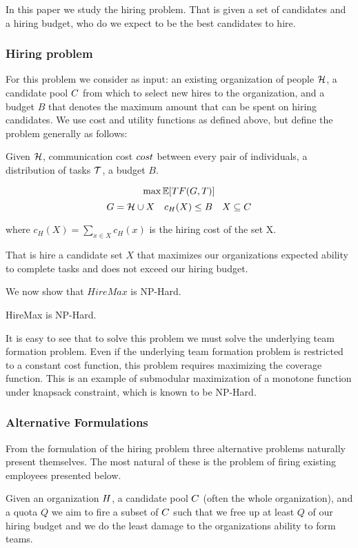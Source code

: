 In this paper we study the hiring problem. That is given a set of candidates and a hiring budget, who do we expect to be the best candidates to hire. 
\subsubsection{Hiring problem}

For this problem we consider as input: an existing organization of people $\mathcal{H}$, a candidate pool ${C}$ from which to select new hires to the organization, and a budget $B$ that denotes the maximum amount that can be spent on hiring candidates.
We use cost and utility functions as defined above, but define the problem generally as follows:
\begin{problem}
[HireMax] Given $\mathcal{H}$, communication cost $cost$ between every pair of individuals, a distribution of tasks $\mathcal{T}$, a budget $B$.

$$ \max \mathbb{E}[TF(G,T)]  $$
$$ G=\mathcal{H}  \cup X \quad c_H(X) \le B \quad X \subseteq C $$

where $c_H(X) = \sum_{x \in X} c_H(x)$ is the hiring cost of the set X.

That is hire a candidate set $X$ that maximizes our organizations expected ability to complete tasks and does not exceed our hiring budget. 
\end{problem}

We now show that $HireMax$ is NP-Hard.
\begin{theorem}
HireMax is NP-Hard.

It is easy to see that to solve this problem we must solve the underlying team formation problem. Even if the underlying team formation problem is restricted to a constant cost function, this problem requires maximizing the coverage function. This is an example of submodular maximization of a monotone function under knapsack constraint, which is known to be NP-Hard.  
\end{theorem}

\subsubsection{Alternative Formulations}

From the formulation of the hiring problem three alternative problems naturally present themselves. The most natural of these is the problem of firing existing employees presented below.  

Given an organization ${H}$, a candidate pool ${C}$ (often the whole organization), and a quota $Q$ we aim to fire a subset  of ${C}$ such that we free up at least $Q$ of our hiring budget and we do the least damage to the organizations ability to form teams.  

